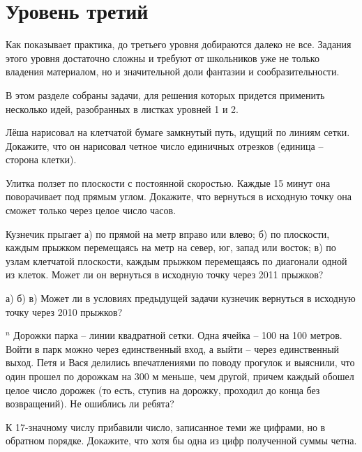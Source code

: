 \section{ Уровень третий}

Как показывает практика, до третьего уровня добираются далеко не все. Задания этого уровня достаточно сложны и требуют от школьников уже не только владения материалом, но и значительной доли фантазии и сообразительности. 

В этом разделе собраны задачи, для решения которых придется применить несколько идей, разобранных в листках уровней 1 и 2.
\begin{thm}
	Лёша нарисовал на клетчатой бумаге замкнутый путь, идущий по линиям сетки. Докажите, что он нарисовал четное число единичных отрезков (единица -- сторона клетки).
\end{thm}
\begin{thm}\label{1.23}
	Улитка ползет по плоскости с постоянной скоростью. Каждые 15 минут она поворачивает под прямым углом. Докажите, что вернуться в исходную точку она сможет только через целое число часов.
\end{thm}
\begin{thm}
	Кузнечик прыгает а) по прямой на  метр вправо или влево; б) по плоскости, каждым прыжком перемещаясь на метр на север, юг, запад или восток; в)  по узлам клетчатой плоскости, каждым прыжком перемещаясь по диагонали одной из клеток. Может ли он вернуться в исходную точку через 2011 прыжков?
\end{thm}
\begin{thm} а) б) в)
	Может ли в условиях предыдущей задачи кузнечик вернуться в исходную точку через 2010 прыжков?
\end{thm}
\begin{thm}
	${}^{n}$ Дорожки парка -- линии квадратной сетки. Одна ячейка -- 100 на 100 метров. Войти в парк можно через единственный вход, а выйти -- через единственный выход. Петя и Вася делились впечатлениями по поводу прогулок и выяснили, что один прошел по дорожкам на 300 м меньше, чем другой, причем каждый обошел целое число дорожек (то есть, ступив на дорожку, проходил до конца без возвращений). Не ошиблись ли ребята?
\end{thm}
\begin{thm}\label{1.27}
	К 17-значному числу прибавили число, записанное теми же цифрами, но в обратном порядке. Докажите, что хотя бы одна из цифр полученной суммы четна.
\end{thm}
